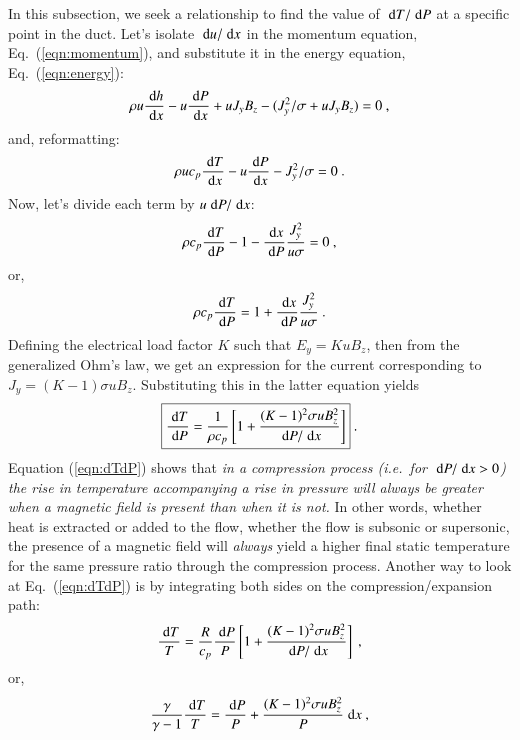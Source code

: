 \documentclass{warpdoc}
\newcommand{\Cp}{{c_{p}}}
\newcommand{\ie}{{\it i.e.}}
\newcommand\frameeqn[1]{\fbox{$\displaystyle #1$}}
\newcommand{\ordi}{\; {\rm d}}
\begin{document}
In this subsection, we seek a relationship to find the value of $\ordi T / \ordi P$
at a specific point in the duct. Let's isolate $\ordi u / \ordi x$ in the momentum
equation, Eq.\ (\ref{eqn:momentum}), and substitute it in the energy equation, Eq.\ (\ref{eqn:energy}):
%
\begin{equation}
\rho u \frac{\ordi h}{\ordi x}
- u \frac{\ordi P}{\ordi x} + u J_y B_z
- (J_y^2/\sigma + u J_y B_z)=0~,
\end{equation}
%
and, reformatting:
%
\begin{equation}
\rho u \Cp \frac{\ordi T}{\ordi x}
- u \frac{\ordi P}{\ordi x}
- J_y^2/\sigma=0~.
\end{equation}
%
Now, let's divide each term by $u \ordi P / \ordi x$:
%
\begin{equation}
\rho \Cp \frac{\ordi T}{\ordi P}
- 1
- \frac{\ordi x }{\ordi P} \frac{J_y^2}{u\sigma}=0~,
\end{equation}
%
or,
%
\begin{equation}
\rho \Cp \frac{\ordi T}{\ordi P}
= 1
+ \frac{\ordi x }{\ordi P} \frac{J_y^2}{u\sigma}~.
\end{equation}
%
Defining the electrical load factor $K$ such that $E_y=K u B_z$, then from the generalized Ohm's
law, we get an expression for the current corresponding to $J_y=(K-1)\sigma u B_z$. Substituting
this in the latter equation yields
%
\begin{equation}
\frameeqn{
\frac{\ordi T}{\ordi P}
= \frac{1}{\rho \Cp} \left[
1
+ \frac{(K-1)^2 \sigma u B_z^2}{\ordi P / \ordi x}
\right]}~.
\label{eqn:dTdP}
\end{equation}
%
Equation (\ref{eqn:dTdP}) shows that \emph{in a compression process (\ie\ for $\ordi P / \ordi x > 0$)
the rise in temperature accompanying a rise in pressure will always be greater when
a magnetic field is present than when it is not.} In other words, whether heat is extracted or
added to the flow, whether the flow is subsonic or supersonic, the presence of a magnetic field
will \emph{always} yield a higher final static temperature for the same pressure ratio through
the compression process. Another way to look at Eq.\ (\ref{eqn:dTdP}) is by integrating both
sides on the compression/expansion path:
%
\begin{equation}
\frac{\ordi T}{T}
= \frac{R}{\Cp} \frac{\ordi P}{P}
\left[ 1 + \frac{(K-1)^2 \sigma u B_z^2}{\ordi P / \ordi x}
\right]~,
\end{equation}
%
%
or,
%
\begin{equation}
\frac{\gamma}{\gamma-1}\frac{\ordi T}{T}
=  \frac{\ordi P}{P}
+ \frac{(K-1)^2 \sigma u B_z^2}{P} \ordi x~,
\end{equation}
\end{document}
